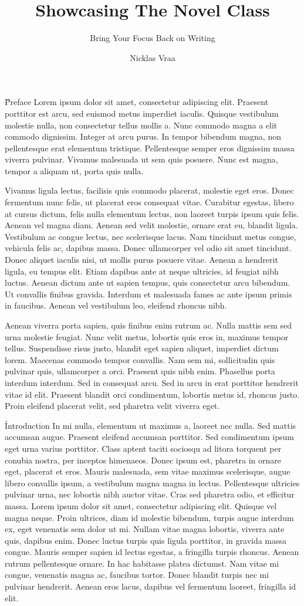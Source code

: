 \documentclass{novel}
\title    {Showcasing The Novel Class}
\subtitle {Bring Your Focus Back on Writing}
\author   {Nicklas Vraa}
\begin{document}
\metadata

\H{Preface}
Lorem ipsum dolor sit amet, consectetur adipiscing elit. Praesent porttitor est arcu, sed euismod metus imperdiet iaculis. Quisque vestibulum molestie nulla, non consectetur tellus mollis a. Nunc commodo magna a elit commodo dignissim. Integer at arcu purus. In tempor bibendum magna, non pellentesque erat elementum tristique. Pellentesque semper eros dignissim massa viverra pulvinar. Vivamus malesuada ut sem quis posuere. Nunc est magna, tempor a aliquam ut, porta quis nulla.

Vivamus ligula lectus, facilisis quis commodo placerat, molestie eget eros. Donec fermentum nunc felis, ut placerat eros consequat vitae. Curabitur egestas, libero at cursus dictum, felis nulla elementum lectus, non laoreet turpis ipsum quis felis. Aenean vel magna diam. Aenean sed velit molestie, ornare erat eu, blandit ligula. Vestibulum ac congue lectus, nec scelerisque lacus. Nam tincidunt metus congue, vehicula felis ac, dapibus massa. Donec ullamcorper vel odio sit amet tincidunt. Donec aliquet iaculis nisi, ut mollis purus posuere vitae. Aenean a hendrerit ligula, eu tempus elit. Etiam dapibus ante at neque ultricies, id feugiat nibh luctus. Aenean dictum ante ut sapien tempus, quis consectetur arcu bibendum. Ut convallis finibus gravida. Interdum et malesuada fames ac ante ipsum primis in faucibus. Aenean vel vestibulum leo, eleifend rhoncus nibh.

Aenean viverra porta sapien, quis finibus enim rutrum ac. Nulla mattis sem sed urna molestie feugiat. Nunc velit metus, lobortis quis eros in, maximus tempor tellus. Suspendisse risus justo, blandit eget sapien aliquet, imperdiet dictum lorem. Maecenas commodo tempor convallis. Nam sem mi, sollicitudin quis pulvinar quis, ullamcorper a orci. Praesent quis nibh enim. Phasellus porta interdum interdum. Sed in consequat arcu. Sed in arcu in erat porttitor hendrerit vitae id elit. Praesent blandit orci condimentum, lobortis metus id, rhoncus justo. Proin eleifend placerat velit, sed pharetra velit viverra eget.

\h{Introduction}
In mi nulla, elementum ut maximus a, laoreet nec nulla. Sed mattis accumsan augue. Praesent eleifend accumsan porttitor. Sed condimentum ipsum eget urna varius porttitor. Class aptent taciti sociosqu ad litora torquent per conubia nostra, per inceptos himenaeos. Donec ipsum est, pharetra in ornare eget, placerat et eros. Mauris malesuada, sem vitae maximus scelerisque, augue libero convallis ipsum, a vestibulum magna magna in lectus. Pellentesque ultricies pulvinar urna, nec lobortis nibh auctor vitae. Cras sed pharetra odio, et efficitur massa. Lorem ipsum dolor sit amet, consectetur adipiscing elit. Quisque vel magna neque. Proin ultrices, diam id molestie bibendum, turpis augue interdum ex, eget venenatis sem dolor ut mi. Nullam vitae magna lobortis, viverra ante quis, dapibus enim. Donec luctus turpis quis ligula porttitor, in gravida massa congue. Mauris semper sapien id lectus egestas, a fringilla turpis rhoncus. Aenean rutrum pellentesque ornare. In hac habitasse platea dictumst. Nam vitae mi congue, venenatis magna ac, faucibus tortor. Donec blandit turpis nec mi pulvinar hendrerit. Aenean eros lacus, dapibus vel fermentum laoreet, fringilla id elit.
\end{document}
